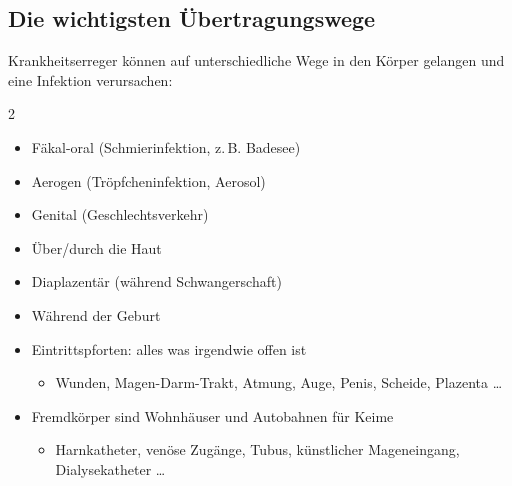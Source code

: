 

\subsection{Die wichtigsten Übertragungswege}
\label{topic:infektion-uebertragungswege}



Krankheitserreger können auf unterschiedliche Wege in den
Körper gelangen und eine Infektion verursachen:

\begin{multicols}{2}
  \begin{itemize}
    \item Fäkal-oral (Schmierinfektion, z.\,B. Badesee)
    \item Aerogen (Tröpfcheninfektion, Aerosol)
    \item Genital (Geschlechtsverkehr)
    \item Über/durch die Haut
    \item Diaplazentär (während Schwangerschaft)
    \item Während der Geburt
    \item Eintrittspforten: alles was irgendwie offen ist
    \begin{itemize}
      \item Wunden, Magen-Darm-Trakt, Atmung, Auge,
      Penis, Scheide,
      Plazenta
      \ldots
    \end{itemize}
    \item Fremdkörper sind Wohnhäuser und Autobahnen für Keime
    \begin{itemize}
      \item Harnkatheter, venöse Zugänge, Tubus, künstlicher
      Mageneingang, Dialysekatheter {\dots}
    \end{itemize}
  \end{itemize}
\end{multicols}




